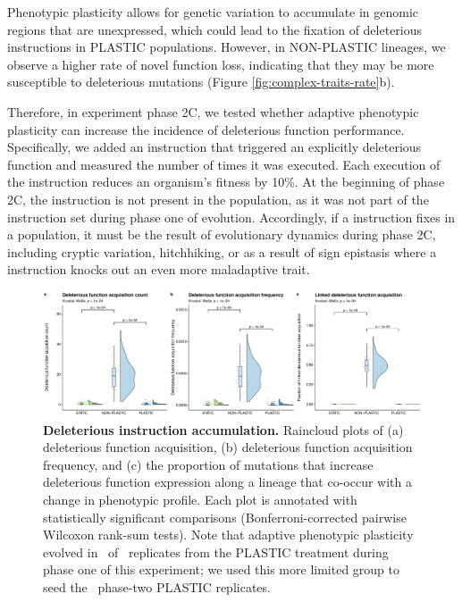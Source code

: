 \documentclass[utf8]{frontiersSCNS} %
\begin{document}
\begin{raggedbottom}
Phenotypic plasticity allows for genetic variation to accumulate in genomic regions that are unexpressed, which could lead to the fixation of deleterious instructions in PLASTIC populations.
However, in NON-PLASTIC lineages, we observe a higher rate of novel function loss, indicating that they may be more susceptible to deleterious mutations (Figure \ref{fig:complex-traits-rate}b).

Therefore, in experiment phase 2C, we tested whether adaptive phenotypic plasticity can increase the incidence of deleterious function performance.
Specifically, we added an instruction that triggered an explicitly deleterious  function and measured the number of times it was executed.
Each execution of the  instruction reduces an organism's fitness by 10\%.
At the beginning of phase 2C, the  instruction is not present in the population, as it was not part of the instruction set during phase one of evolution.
Accordingly, if a  instruction fixes in a population, it must be the result of evolutionary dynamics during phase 2C, including cryptic variation, hitchhiking, or as a result of sign epistasis where a  instruction knocks out an even more maladaptive trait.

\begin{figure}[ht!]
  \centering
  \includegraphics[width=1.0\textwidth]{media-poison-accumulation-panel.pdf}
  \caption{\small
  \textbf{Deleterious instruction accumulation.}
  Raincloud plots of
  (a) deleterious function acquisition,
  (b) deleterious function acquisition frequency,
  and (c) the proportion of mutations that increase deleterious function expression along a lineage that co-occur with a change in phenotypic profile.
  Each plot is annotated with statistically significant comparisons (Bonferroni-corrected pairwise Wilcoxon rank-sum tests).
  Note that adaptive phenotypic plasticity evolved in \deleteriousHitchhikingPlasticReps\ of \deleteriousHitchhikingReplicates\ replicates from the PLASTIC treatment during phase one of this experiment; we used this more limited group to seed the \deleteriousHitchhikingPlasticReps\ phase-two PLASTIC replicates.
  }
  \label{fig:deleterious-hitchhiking}
\end{figure}


\end{raggedbottom}
\end{document}
